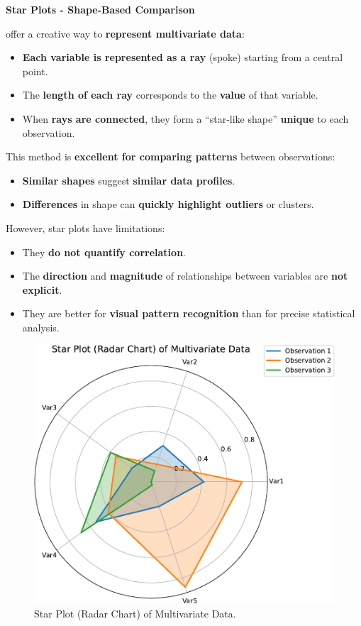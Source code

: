 \begin{flushleft}
    \textcolor{Green3}{ \textbf{Star Plots - Shape-Based Comparison}}
\end{flushleft}
 offer a creative way to \textbf{represent multivariate data}:
\begin{itemize}
    \item \textbf{Each variable is represented as a ray} (spoke) starting from a central point.
    \item The \textbf{length of each ray} corresponds to the \textbf{value} of that variable.
    \item When \textbf{rays are connected}, they form a ``star-like shape'' \textbf{unique} to each observation.
\end{itemize}
This method is \textbf{excellent for comparing patterns} between observations:
\begin{itemize}[label=\textcolor{Green3}{}]
    \item \textbf{Similar shapes} suggest \textbf{similar data profiles}.
    \item \textbf{Differences} in shape can \textbf{quickly highlight outliers} or clusters.
\end{itemize}
However, star plots have limitations:
\begin{itemize}[label=\textcolor{Red2}{}]
    \item They \textbf{do not quantify correlation}.
    \item The \textbf{direction} and \textbf{magnitude} of relationships between variables are \textbf{not explicit}.
    \item They are better for \textbf{visual pattern recognition} than for precise statistical analysis.
\end{itemize}

\begin{figure}[!htp]
    \centering
    \includegraphics[width=.8\textwidth]{img/star-plot.pdf}
    \caption{Star Plot (Radar Chart) of Multivariate Data.}
\end{figure}

